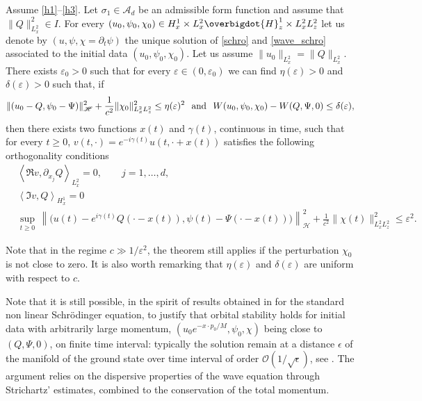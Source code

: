 \begin{theo}\label{orbital_stab_2}
Assume \eqref{h1}--\eqref{h3}. Let $\sigma_{1}\in\mathscr{A}_{d}$ be an admissible form function and assume that $\|Q\|_{L_{x}^{2}}^{2}\in I$.
For every $(u_{0},\psi_{0},\chi_{0})\in H_{x}^{1}\times L_{x}^{2}\overbigdot{H}_{z}^{1}\times L_{x}^{2}L_{z}^{2}$ let us denote by $(u,\psi,\chi=\partial_t\psi)$ the unique solution of \eqref{schro} and \eqref{wave_schro} associated to the initial data $(u_{0},\psi_{0},\chi_{0})$. Let us assume $\|u_{0}\|_{L_{x}^{2}}=\|Q\|_{L_{x}^{2}}$. There exists $\varepsilon_{0}>0$ such that for every $\varepsilon\in(0,\varepsilon_{0})$ we can find $\eta(\varepsilon)>0$ and $\delta(\varepsilon)>0$ such that, if
\[
\|(u_{0}-Q,\psi_{0}-\Psi)\|_{\mathscr {H}}^{2}+\frac{1}{c^{2}}\|\chi_{0}\|_{L_{x}^{2}L_{z}^{2}}^{2}\leq\eta(\varepsilon)^{2} \hspace{0.25cm}\text{and}\hspace{0.25cm} W(u_{0},\psi_{0},\chi_{0})-W(Q,\Psi,0)\leq\delta(\varepsilon),
\]
then there exists two functions $x(t)$ and $\gamma(t)$, continuous in time, such that for every $t\geq 0$, $v(t,\cdot)=e^{-i\gamma(t)}u(t,\cdot+x(t))$ satisfies the following orthogonality conditions\vspace*{-3pt}
\begin{subequations}
\begin{align}
\label{ortho1}
&\left\langle\Re  v,\partial_{x_{j}}Q\right\rangle_{L_{x}^{2}}=0, \qquad j=1,\ldots,d,\\
\label{ortho2}
&\left\langle\Im  v,Q\right\rangle_{H_{x}^{1}}=0\\
\tag*{and}
&\underset{t\geq 0}{\sup}\,\left\|
\big(u(t)-e^{i\gamma(t)}Q(\cdot-x(t)),\psi(t)-\Psi(\cdot-x(t))\big)\right\|_{\mathscr {H}}^{2}+\frac{1}{c^{2}}\|\chi(t)\|_{L_{x}^{2}L_{z}^{2}}^{2}\leq\varepsilon^{2}.
\end{align}
\end{subequations}
\end{theo}

\begin{rmk}
Note that in the regime $c\gg 1/\varepsilon^{2}$, the theorem still applies if the perturbation $\chi_{0}$ is not close to zero.
It is also worth remarking that $\eta(\varepsilon)$ and $\delta(\varepsilon)$ are uniform with respect to $c$.
\end{rmk}

\begin{rmk} Note that it is still possible, in the spirit of results obtained in \cite{Faou} for the standard non linear Schrödinger equation, to justify that orbital stability holds for initial data with arbitrarily large momentum, $(u_0e^{-x\cdot p_0/M},\psi_0,\chi)$ being close to $(Q,\Psi,0)$, on finite time interval:
typically the solution remain at a distance $\epsilon$ of the manifold of the
ground state over time interval of order $\mathscr O(1/\sqrt\epsilon)$, see
\cite[Th.\,4.2.11 \& \S4.6]{LV_PhD}.
The argument relies on the dispersive properties
of the wave equation through Strichartz' estimates, combined to the conservation of the total momentum.
\end{rmk}

